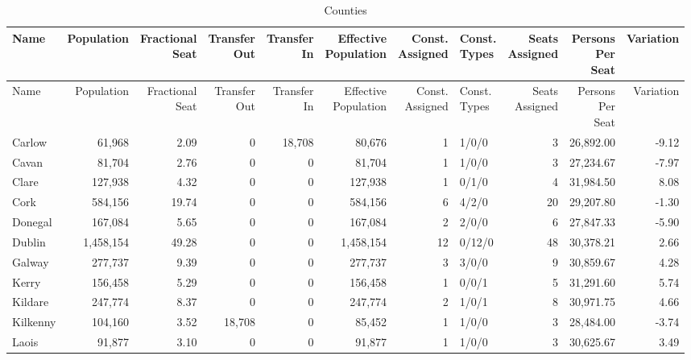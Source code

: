 \documentclass[a4paper]{article}
\begin{document}
\begin{longtable}{lrrrrrrlrrr}
\caption{Counties}
\\ \toprule
Name &Population &\shortstack{Fractional\\Seat} &\shortstack{Transfer\\Out} &\shortstack{Transfer\\In} &\shortstack{Effective\\Population} &\shortstack{Const.\\Assigned} &\shortstack{Const.\\Types} &\shortstack{Seats\\Assigned} &\shortstack{Persons\\Per\\Seat} &Variation \\ \midrule
\endfirsthead
\toprule
Name &Population &\shortstack{Fractional\\Seat} &\shortstack{Transfer\\Out} &\shortstack{Transfer\\In} &\shortstack{Effective\\Population} &\shortstack{Const.\\Assigned} &\shortstack{Const.\\Types} &\shortstack{Seats\\Assigned} &\shortstack{Persons\\Per\\Seat} &Variation \\ \midrule
\endhead
\bottomrule
\endfoot
Carlow&61,968& 2.09&0&18,708&80,676&1&1/0/0&3&26,892.00&-9.12\\ 
Cavan&81,704& 2.76&0&0&81,704&1&1/0/0&3&27,234.67&-7.97\\ 
Clare&127,938& 4.32&0&0&127,938&1&0/1/0&4&31,984.50& 8.08\\ 
Cork&584,156&19.74&0&0&584,156&6&4/2/0&20&29,207.80&-1.30\\ 
Donegal&167,084& 5.65&0&0&167,084&2&2/0/0&6&27,847.33&-5.90\\ 
Dublin&1,458,154&49.28&0&0&1,458,154&12&0/12/0&48&30,378.21& 2.66\\ 
Galway&277,737& 9.39&0&0&277,737&3&3/0/0&9&30,859.67& 4.28\\ 
Kerry&156,458& 5.29&0&0&156,458&1&0/0/1&5&31,291.60& 5.74\\ 
Kildare&247,774& 8.37&0&0&247,774&2&1/0/1&8&30,971.75& 4.66\\ 
Kilkenny&104,160& 3.52&18,708&0&85,452&1&1/0/0&3&28,484.00&-3.74\\ 
Laois&91,877& 3.10&0&0&91,877&1&1/0/0&3&30,625.67& 3.49\\ 

\end{longtable}
\end{document}
